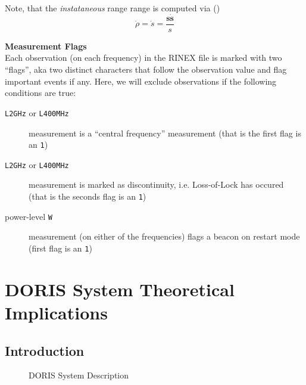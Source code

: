 Note, that the \emph{instataneous} range range is computed via (\cite{Montenbruck2000})
\begin{equation}
  \dot{\rho} = \dot{s} = \frac{\bm{s} \bm{\dot{s}}}{s}
\end{equation}

\textbf{Measurement Flags}\\
\label{measurement-flags}
Each observation (on each frequency) in the RINEX file is marked with two ``flags'', 
aka two distinct characters that follow the observation value and flag important 
events if any. Here, we will exclude observations if the following conditions are true:
\begin{description}
  \item[\texttt{L2GHz} or \texttt{L400MHz}] measurement is a ``central frequency'' measurement (that is the 
  first flag is an \texttt{1})
  \item[\texttt{L2GHz} or \texttt{L400MHz}] measurement is marked as discontinuity, i.e. Loss-of-Lock has occured 
  (that is the seconds flag is an \texttt{1})
  \item[power-level \texttt{W}] measurement (on either of the frequencies) flags a 
  beacon on restart mode (first flag is an \texttt{1})
\end{description}


\chapter{DORIS System Theoretical Implications}
\label{ch:doris-theory}

\section{Introduction}
\label{sec:doris-introduction}

\begin{figure}
\centering

\caption{DORIS System Description}
\label{fig:doris-system-description}
\end{figure}

